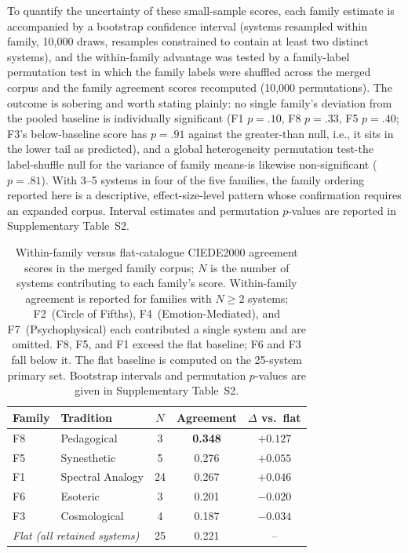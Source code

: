 \documentclass[12pt]{article}
\begin{document}
To quantify the uncertainty of these small-sample scores, each family
estimate is accompanied by a bootstrap confidence interval (systems
resampled within family, 10,000 draws, resamples constrained to
contain at least two distinct systems), and the within-family
advantage was tested by a family-label permutation test in which the
family labels were shuffled across the merged corpus and the family
agreement scores recomputed (10,000 permutations). The outcome is
sobering and worth stating plainly: no single family's deviation from
the pooled baseline is individually significant (F1 $p = .10$, F8
$p = .33$, F5 $p = .40$; F3's below-baseline score has $p = .91$
against the greater-than null, i.e., it sits in the lower tail as
predicted), and a global heterogeneity permutation test-the
label-shuffle null for the variance of family means-is likewise
non-significant ($p = .81$). With 3--5 systems in four of the five
families, the family ordering reported here is a descriptive,
effect-size-level pattern whose confirmation requires an expanded
corpus. Interval estimates and permutation $p$-values are reported in
Supplementary Table~S2.

\begin{table}[htbp]
\centering
\caption{Within-family versus flat-catalogue CIEDE2000 agreement
scores in the merged family corpus; $N$ is the number of systems
contributing to each family's score. Within-family agreement is
reported for families with $N \ge 2$ systems; F2~(Circle of Fifths),
F4~(Emotion-Mediated), and F7~(Psychophysical) each contributed a
single system and are omitted. F8, F5, and F1 exceed the flat
baseline; F6 and F3 fall below it. The flat baseline is computed on
the 25-system primary set. Bootstrap intervals and permutation
$p$-values are given in Supplementary Table~S2.}
\label{tab:family_agreement}
\begin{tabular}{@{}llccc@{}}
\toprule
\textbf{Family} & \textbf{Tradition} & \textbf{$N$} &
  \textbf{Agreement} & \textbf{$\Delta$ vs.\ flat} \\
\midrule
F8 & Pedagogical      & 3  & \textbf{0.348} & $+0.127$ \\
F5 & Synesthetic      & 5  & 0.276          & $+0.055$ \\
F1 & Spectral Analogy & 24 & 0.267          & $+0.046$ \\
F6 & Esoteric         & 3  & 0.201          & $-0.020$ \\
F3 & Cosmological     & 4  & 0.187          & $-0.034$ \\
\midrule
\multicolumn{2}{l}{\textit{Flat (all retained systems)}} & 25 & 0.221
  & -- \\
\bottomrule
\end{tabular}
\end{table}
\end{document}
